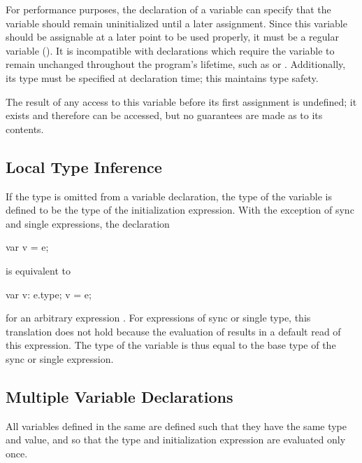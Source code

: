 For performance purposes, the declaration of a variable can specify that the variable should remain uninitialized until a later assignment.  Since this variable should be assignable at a later point to be used properly, it must be a regular variable ().  It is incompatible with declarations which require the variable to remain unchanged throughout the program's lifetime, such as  or .  Additionally, its type must be specified at declaration time; this maintains type safety.

The result of any access to this variable before its first assignment is undefined; it exists and therefore can be accessed, but no guarantees are made as to its contents.

\subsection{Local Type Inference}
\label{Local_Type_Inference}

If the type is omitted from a variable declaration, the type of the
variable is defined to be the type of the initialization expression.
With the exception of sync and single expressions, the declaration
\begin{chapel}
var v = e;
\end{chapel}
is equivalent to
\begin{chapel}
var v: e.type;
v = e;
\end{chapel}
for an arbitrary expression .  For expressions of sync or
single type, this translation does not hold because the evaluation
of  results in a default read of this expression.  The type of
the variable is thus equal to the base type of the sync or single
expression.

\subsection{Multiple Variable Declarations}
\label{Multiple_Variable_Declarations}

All variables defined in the same  are defined
such that they have the same type and value, and so that the type and
initialization expression are evaluated only once.

